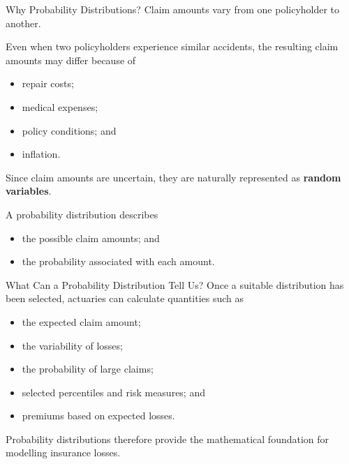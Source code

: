 \documentclass[
  ignorenonframetext,
  aspectratio=169,
]{beamer}
\providecommand{\tightlist}{%
  \setlength{\itemsep}{0pt}\setlength{\parskip}{0pt}}
\begin{document}
\begin{frame}{Why Probability Distributions?}
\protect{}\label{why-probability-distributions}
Claim amounts vary from one policyholder to another.

Even when two policyholders experience similar accidents, the resulting
claim amounts may differ because of

\begin{itemize}
\tightlist
\item
  repair costs;
\item
  medical expenses;
\item
  policy conditions; and
\item
  inflation.
\end{itemize}

Since claim amounts are uncertain, they are naturally represented as
\textbf{random variables}.

A probability distribution describes

\begin{itemize}
\tightlist
\item
  the possible claim amounts; and
\item
  the probability associated with each amount.
\end{itemize}
\end{frame}

\begin{frame}{What Can a Probability Distribution Tell Us?}
\protect{}\label{what-can-a-probability-distribution-tell-us}
Once a suitable distribution has been selected, actuaries can calculate
quantities such as

\begin{itemize}
\tightlist
\item
  the expected claim amount;
\item
  the variability of losses;
\item
  the probability of large claims;
\item
  selected percentiles and risk measures; and
\item
  premiums based on expected losses.
\end{itemize}

Probability distributions therefore provide the mathematical foundation
for modelling insurance losses.
\end{frame}
\end{document}
